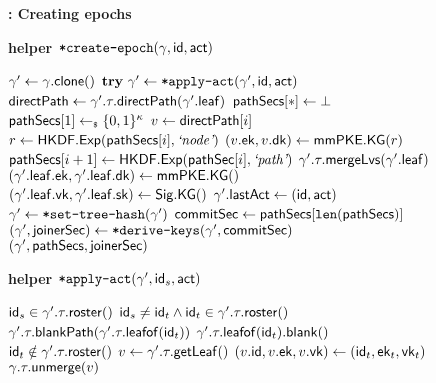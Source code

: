 \begin{figure*}[!p]
  	\begin{anybox}{\sffamily\bfseries \saik : Creating epochs}
			\begin{minipage}[t]{.49\linewidth}
        {\bf {helper ${\textnormal{\tt*create-epoch}}(\gamma, {\mathsf{id}}, \mathsf{act})$}}
				\begin{algorithmic}
          \State $\gamma' \gets \gamma.{\mathsf{clone}}()$
          \State \vspace*{-.7em}
          \State $\textbf{try}\ \gamma' \gets {\ensuremath{\textnormal{\tt*apply-act}}}(\gamma', {\mathsf{id}}, \mathsf{act})$
          \State {}
          \State ${\mathsf{directPath}} \gets \gamma'.\tau.{\mathsf{directPath}}(\gamma'.{\mathsf{leaf}})$
          \State ${\mathsf{pathSecs}}[*] \gets \bot$
          \State ${\mathsf{pathSecs}}[1] \gets_{\scriptscriptstyle\$} \{0,1\}^\kappa$
            \State $v \gets {\ensuremath{\mathsf{directPath}}}[i]$
					  \State $r \gets {\ensuremath{\mathsf{HKDF}}}.{\mathsf{Exp}}({\mathsf{pathSecs}}[i], {\text{\normalfont \it`node'}})$
            \State $(v.{\mathsf{ek}}, v.{\mathsf{dk}}) \gets {\ensuremath{\mathsf{mmPKE}}}.{\mathsf{KG}}(r)$
            \State ${\mathsf{pathSecs}}[i+1] \gets {\ensuremath{\mathsf{HKDF}}}.{\mathsf{Exp}}({\mathsf{pathSec}}[i], {\text{\normalfont \it`path'}})$
          \EndFor
          \State $\gamma'.\tau.{\mathsf{mergeLvs}}(\gamma'.{\mathsf{leaf}})$
          \State {}
          \State $(\gamma'.{\mathsf{leaf}}.{\mathsf{ek}}, \gamma'.{\mathsf{leaf}}.{\mathsf{dk}}) \gets {\ensuremath{\mathsf{mmPKE}}}.{\mathsf{KG}}()$
          \State $(\gamma'.{\mathsf{leaf}}.{\mathsf{vk}}, \gamma'.{\mathsf{leaf}}.{\mathsf{sk}}) \gets {\ensuremath{\mathsf{Sig}}}.{\mathsf{KG}}()$
          \State \vspace*{-.5em}
          \State $\gamma'.{\mathsf{lastAct}} \gets ({\mathsf{id}}, \mathsf{act})$
          \State $\gamma' \gets {{\ensuremath{\textnormal{\tt*set-tree-hash}}}}(\gamma')$
          \State ${\mathsf{commitSec}} \gets {\ensuremath{\mathsf{pathSecs}}}[\texttt{len}({\mathsf{pathSecs}})]$
          \State $(\gamma', {\mathsf{joinerSec}}) \gets {{\ensuremath{\textnormal{\tt*derive-keys}}}}(\gamma', {\mathsf{commitSec}})$
          \State \Return $(\gamma', {\mathsf{pathSecs}}, {\mathsf{joinerSec}})$
        \end{algorithmic}

        \medskip
        {\bf {helper ${\textnormal{\tt*apply-act}}(\gamma', {\mathsf{id}}_s, \mathsf{act})$}}
				\begin{algorithmic}
          \State \KwReq{} ${\mathsf{id}}_s \in \gamma'.\tau.{\mathsf{roster}}()$
            \State \KwReq{} ${\mathsf{id}}_s \neq {\ensuremath{\mathsf{id}}}_t \land {\ensuremath{\mathsf{id}}}_t \in \gamma'.\tau.{\mathsf{roster}}()$
            \State $\gamma'.\tau.{\mathsf{blankPath}}(\gamma'.\tau.{\mathsf{leafof}}({\mathsf{id}}_t))$
            \State $\gamma'.\tau.{\mathsf{leafof}}({\mathsf{id}}_t).{\mathsf{blank}}()$
            \State \KwReq{} ${\mathsf{id}}_t \notin \gamma'.\tau.{\mathsf{roster}}()$
            \State $v \gets \gamma'.\tau.{\mathsf{getLeaf}}()$
            \State $(v.{\mathsf{id}}, v.{\mathsf{ek}}, v.{\mathsf{vk}}) \gets ({\mathsf{id}}_t, {\mathsf{ek}}_t, {\mathsf{vk}}_t)$
            \State $\gamma.\tau.{\mathsf{unmerge}}(v)$
          \EndIf
        \end{algorithmic}


\end{minipage}
\end{anybox}
\end{figure*}
